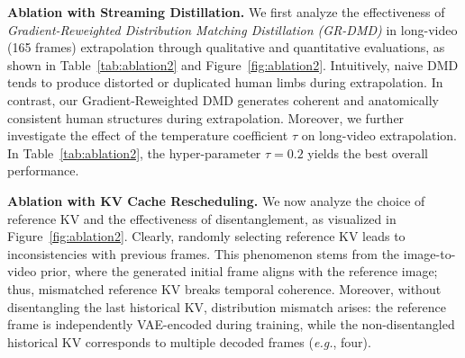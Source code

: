 \noindent
\textbf{Ablation with Streaming Distillation.}
% 
We first analyze the effectiveness of \textit{Gradient-Reweighted Distribution Matching Distillation (GR-DMD)} in long-video (165 frames) extrapolation through qualitative and quantitative evaluations, as shown in Table~\ref{tab:ablation2} and Figure~\ref{fig:ablation2}.
% 
Intuitively, naive DMD tends to produce distorted or duplicated human limbs during extrapolation.
% 
In contrast, our Gradient-Reweighted DMD generates coherent and anatomically consistent human structures during extrapolation.
% 
Moreover, we further investigate the effect of the temperature coefficient $\tau$ on long-video extrapolation.
% 
In Table~\ref{tab:ablation2}, the hyper-parameter $\tau=0.2$ yields the best overall performance.



\noindent
\textbf{Ablation with KV Cache Rescheduling.}
% 
We now analyze the choice of reference KV and the effectiveness of disentanglement, as visualized in Figure~\ref{fig:ablation2}.
% 
Clearly, randomly selecting reference KV leads to inconsistencies with previous frames.
This phenomenon stems from the image-to-video prior, where the generated initial frame aligns with the reference image; thus, mismatched reference KV breaks temporal coherence.
% 
Moreover, without disentangling the last historical KV, distribution mismatch arises: the reference frame is independently VAE-encoded during training, while the non-disentangled historical KV corresponds to multiple decoded frames (\emph{e.g.}, four).
